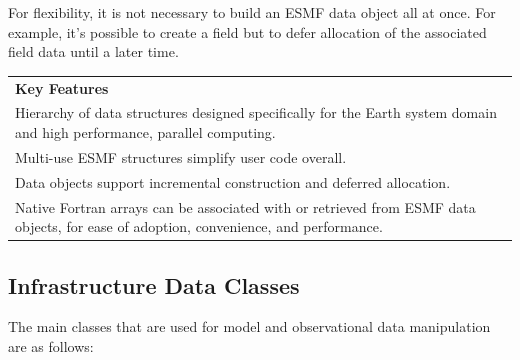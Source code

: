 For flexibility, it is not necessary to build an ESMF data object 
all at once.  For example, it's possible to create a 
field but to defer allocation of the associated field data until 
a later time.


\begin{center}  
\begin{tabular}{|p{6in}|}
\hline
\vspace{.01in}
{\bf Key Features} \\[.01in]
Hierarchy of data structures designed specifically for the Earth 
system domain and high performance, parallel computing. \\
Multi-use ESMF structures simplify user code overall. \\
Data objects support incremental construction and deferred allocation. \\ 
Native Fortran arrays can be associated with or retrieved from ESMF data
objects, for ease of adoption, convenience, and performance. \\[.03in] \hline
\end{tabular}
\end{center}

\subsection{Infrastructure Data Classes}

The main classes that are used for model and observational data manipulation
are as follows:

